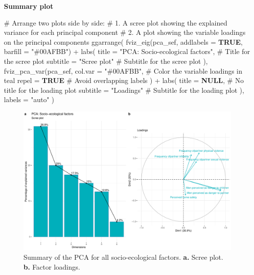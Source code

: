 \documentclass[
  bookmarksnumbered]{article}
\newenvironment{Shaded}{\begin{snugshade}}{\end{snugshade}}
\newcommand{\AttributeTok}[1]{\textcolor[rgb]{0.80,0.80,0.80}{#1}}
\newcommand{\CommentTok}[1]{\textcolor[rgb]{0.50,0.62,0.50}{#1}}
\newcommand{\ConstantTok}[1]{\textcolor[rgb]{0.86,0.64,0.64}{\textbf{#1}}}
\newcommand{\FunctionTok}[1]{\textcolor[rgb]{0.94,0.94,0.56}{#1}}
\newcommand{\NormalTok}[1]{\textcolor[rgb]{0.80,0.80,0.80}{#1}}
\newcommand{\SpecialCharTok}[1]{\textcolor[rgb]{0.86,0.64,0.64}{#1}}
\newcommand{\StringTok}[1]{\textcolor[rgb]{0.80,0.58,0.58}{#1}}
\begin{document}
\textbf{Summary plot}

\begin{Shaded}
\begin{Highlighting}[]
\CommentTok{\# Arrange two plots side by side:}
\CommentTok{\# 1. A scree plot showing the explained variance for each principal component}
\CommentTok{\# 2. A plot showing the variable loadings on the principal components}
\FunctionTok{ggarrange}\NormalTok{(}
  \FunctionTok{fviz\_eig}\NormalTok{(pca\_sef, }\AttributeTok{addlabels =} \ConstantTok{TRUE}\NormalTok{, }\AttributeTok{barfill =} \StringTok{"\#00AFBB"}\NormalTok{) }\SpecialCharTok{+}
    \FunctionTok{labs}\NormalTok{(}
      \AttributeTok{title =} \StringTok{"PCA: Socio{-}ecological factors"}\NormalTok{, }\CommentTok{\# Title for the scree plot}
      \AttributeTok{subtitle =} \StringTok{"Scree plot"} \CommentTok{\# Subtitle for the scree plot}
\NormalTok{    ),}
  \FunctionTok{fviz\_pca\_var}\NormalTok{(pca\_sef,}
               \AttributeTok{col.var =} \StringTok{"\#00AFBB"}\NormalTok{, }\CommentTok{\# Color the variable loadings in teal}
               \AttributeTok{repel =} \ConstantTok{TRUE} \CommentTok{\# Avoid overlapping labels}
\NormalTok{  ) }\SpecialCharTok{+}
    \FunctionTok{labs}\NormalTok{(}
      \AttributeTok{title =} \ConstantTok{NULL}\NormalTok{, }\CommentTok{\# No title for the loading plot}
      \AttributeTok{subtitle =} \StringTok{"Loadings"} \CommentTok{\# Subtitle for the loading plot}
\NormalTok{    ),}
  \AttributeTok{labels =} \StringTok{"auto"}
\NormalTok{)}
\end{Highlighting}
\end{Shaded}

\begin{figure}
\centering
\includegraphics{Supplementary_material_files/figure-latex/pca-sef-plot-1.pdf}
\caption{\label{fig:pca-sef-plot}Summary of the PCA for all socio-ecological factors. \textbf{a.} Scree plot. \textbf{b.} Factor loadings.}
\end{figure}
\end{document}
